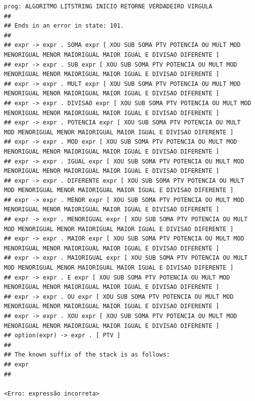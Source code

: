 \documentclass[hidelinks,12pt]{article}
\begin{document}
\begin{lstlisting}
prog: ALGORITMO LITSTRING INICIO RETORNE VERDADEIRO VIRGULA 
##
## Ends in an error in state: 101.
##
## expr -> expr . SOMA expr [ XOU SUB SOMA PTV POTENCIA OU MULT MOD MENORIGUAL MENOR MAIORIGUAL MAIOR IGUAL E DIVISAO DIFERENTE ]
## expr -> expr . SUB expr [ XOU SUB SOMA PTV POTENCIA OU MULT MOD MENORIGUAL MENOR MAIORIGUAL MAIOR IGUAL E DIVISAO DIFERENTE ]
## expr -> expr . MULT expr [ XOU SUB SOMA PTV POTENCIA OU MULT MOD MENORIGUAL MENOR MAIORIGUAL MAIOR IGUAL E DIVISAO DIFERENTE ]
## expr -> expr . DIVISAO expr [ XOU SUB SOMA PTV POTENCIA OU MULT MOD MENORIGUAL MENOR MAIORIGUAL MAIOR IGUAL E DIVISAO DIFERENTE ]
## expr -> expr . POTENCIA expr [ XOU SUB SOMA PTV POTENCIA OU MULT MOD MENORIGUAL MENOR MAIORIGUAL MAIOR IGUAL E DIVISAO DIFERENTE ]
## expr -> expr . MOD expr [ XOU SUB SOMA PTV POTENCIA OU MULT MOD MENORIGUAL MENOR MAIORIGUAL MAIOR IGUAL E DIVISAO DIFERENTE ]
## expr -> expr . IGUAL expr [ XOU SUB SOMA PTV POTENCIA OU MULT MOD MENORIGUAL MENOR MAIORIGUAL MAIOR IGUAL E DIVISAO DIFERENTE ]
## expr -> expr . DIFERENTE expr [ XOU SUB SOMA PTV POTENCIA OU MULT MOD MENORIGUAL MENOR MAIORIGUAL MAIOR IGUAL E DIVISAO DIFERENTE ]
## expr -> expr . MENOR expr [ XOU SUB SOMA PTV POTENCIA OU MULT MOD MENORIGUAL MENOR MAIORIGUAL MAIOR IGUAL E DIVISAO DIFERENTE ]
## expr -> expr . MENORIGUAL expr [ XOU SUB SOMA PTV POTENCIA OU MULT MOD MENORIGUAL MENOR MAIORIGUAL MAIOR IGUAL E DIVISAO DIFERENTE ]
## expr -> expr . MAIOR expr [ XOU SUB SOMA PTV POTENCIA OU MULT MOD MENORIGUAL MENOR MAIORIGUAL MAIOR IGUAL E DIVISAO DIFERENTE ]
## expr -> expr . MAIORIGUAL expr [ XOU SUB SOMA PTV POTENCIA OU MULT MOD MENORIGUAL MENOR MAIORIGUAL MAIOR IGUAL E DIVISAO DIFERENTE ]
## expr -> expr . E expr [ XOU SUB SOMA PTV POTENCIA OU MULT MOD MENORIGUAL MENOR MAIORIGUAL MAIOR IGUAL E DIVISAO DIFERENTE ]
## expr -> expr . OU expr [ XOU SUB SOMA PTV POTENCIA OU MULT MOD MENORIGUAL MENOR MAIORIGUAL MAIOR IGUAL E DIVISAO DIFERENTE ]
## expr -> expr . XOU expr [ XOU SUB SOMA PTV POTENCIA OU MULT MOD MENORIGUAL MENOR MAIORIGUAL MAIOR IGUAL E DIVISAO DIFERENTE ]
## option(expr) -> expr . [ PTV ]
##
## The known suffix of the stack is as follows:
## expr 
##

<Erro: expressão incorreta>


\end{lstlisting}
\end{document}

